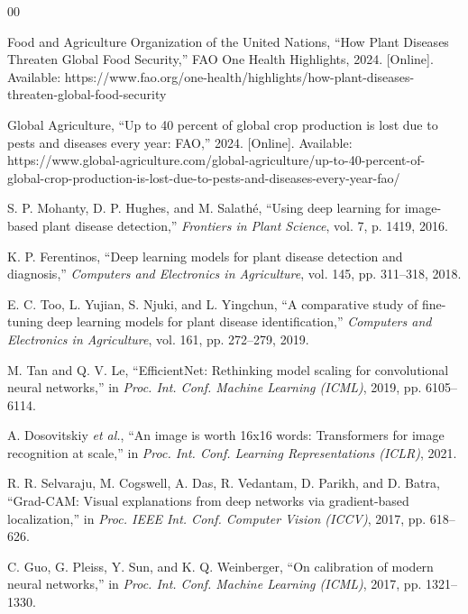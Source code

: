 \documentclass[conference]{IEEEtran}
\begin{document}
\begin{thebibliography}{00}

Food and Agriculture Organization of the United Nations, ``How Plant Diseases Threaten Global Food Security,'' FAO One Health Highlights, 2024. [Online]. Available: https://www.fao.org/one-health/highlights/how-plant-diseases-threaten-global-food-security

Global Agriculture, ``Up to 40 percent of global crop production is lost due to pests and diseases every year: FAO,'' 2024. [Online]. Available: https://www.global-agriculture.com/global-agriculture/up-to-40-percent-of-global-crop-production-is-lost-due-to-pests-and-diseases-every-year-fao/

S. P. Mohanty, D. P. Hughes, and M. Salath\'{e}, ``Using deep learning for image-based plant disease detection,'' \textit{Frontiers in Plant Science}, vol. 7, p. 1419, 2016.

K. P. Ferentinos, ``Deep learning models for plant disease detection and diagnosis,'' \textit{Computers and Electronics in Agriculture}, vol. 145, pp. 311--318, 2018.

E. C. Too, L. Yujian, S. Njuki, and L. Yingchun, ``A comparative study of fine-tuning deep learning models for plant disease identification,'' \textit{Computers and Electronics in Agriculture}, vol. 161, pp. 272--279, 2019.

M. Tan and Q. V. Le, ``EfficientNet: Rethinking model scaling for convolutional neural networks,'' in \textit{Proc. Int. Conf. Machine Learning (ICML)}, 2019, pp. 6105--6114.

A. Dosovitskiy \textit{et al.}, ``An image is worth 16x16 words: Transformers for image recognition at scale,'' in \textit{Proc. Int. Conf. Learning Representations (ICLR)}, 2021.

R. R. Selvaraju, M. Cogswell, A. Das, R. Vedantam, D. Parikh, and D. Batra, ``Grad-CAM: Visual explanations from deep networks via gradient-based localization,'' in \textit{Proc. IEEE Int. Conf. Computer Vision (ICCV)}, 2017, pp. 618--626.

C. Guo, G. Pleiss, Y. Sun, and K. Q. Weinberger, ``On calibration of modern neural networks,'' in \textit{Proc. Int. Conf. Machine Learning (ICML)}, 2017, pp. 1321--1330.


\end{thebibliography}
\end{document}
